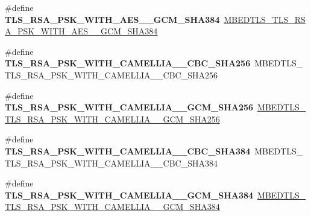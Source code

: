 \begin{DoxyCompactItemize}
\item 
\mbox{\label{compat-1_83_8h_a181e844e18eeacf8f90488d5f73ebfb4}} 
\#define {\bfseries T\+L\+S\+\_\+\+R\+S\+A\+\_\+\+P\+S\+K\+\_\+\+W\+I\+T\+H\+\_\+\+A\+E\+S\+\_\+\_\+\+G\+C\+M\+\_\+\+S\+H\+A384}~\mbox{\hyperlink{ssl__ciphersuites_8h_ad98034d6f7ac6779cc51cb6b7435e2d3}{M\+B\+E\+D\+T\+L\+S\+\_\+\+T\+L\+S\+\_\+\+R\+S\+A\+\_\+\+P\+S\+K\+\_\+\+W\+I\+T\+H\+\_\+\+A\+E\+S\+\_\+\_\+\+G\+C\+M\+\_\+\+S\+H\+A384}}
\item 
\mbox{\label{compat-1_83_8h_a859b00f29ee536f803970513f2ed6ad0}} 
\#define {\bfseries T\+L\+S\+\_\+\+R\+S\+A\+\_\+\+P\+S\+K\+\_\+\+W\+I\+T\+H\+\_\+\+C\+A\+M\+E\+L\+L\+I\+A\+\_\+\_\+\+C\+B\+C\+\_\+\+S\+H\+A256}~M\+B\+E\+D\+T\+L\+S\+\_\+\+T\+L\+S\+\_\+\+R\+S\+A\+\_\+\+P\+S\+K\+\_\+\+W\+I\+T\+H\+\_\+\+C\+A\+M\+E\+L\+L\+I\+A\+\_\+\_\+\+C\+B\+C\+\_\+\+S\+H\+A256
\item 
\mbox{\label{compat-1_83_8h_a581d8a6cbdd0a2f8ef8711332ef2cb10}} 
\#define {\bfseries T\+L\+S\+\_\+\+R\+S\+A\+\_\+\+P\+S\+K\+\_\+\+W\+I\+T\+H\+\_\+\+C\+A\+M\+E\+L\+L\+I\+A\+\_\+\_\+\+G\+C\+M\+\_\+\+S\+H\+A256}~\mbox{\hyperlink{ssl__ciphersuites_8h_a104408aa7e8fc126ea6c98fdd295be0c}{M\+B\+E\+D\+T\+L\+S\+\_\+\+T\+L\+S\+\_\+\+R\+S\+A\+\_\+\+P\+S\+K\+\_\+\+W\+I\+T\+H\+\_\+\+C\+A\+M\+E\+L\+L\+I\+A\+\_\+\_\+\+G\+C\+M\+\_\+\+S\+H\+A256}}
\item 
\mbox{\label{compat-1_83_8h_ab14a2a48c1b1b5e82fa8d16d94ac1ac5}} 
\#define {\bfseries T\+L\+S\+\_\+\+R\+S\+A\+\_\+\+P\+S\+K\+\_\+\+W\+I\+T\+H\+\_\+\+C\+A\+M\+E\+L\+L\+I\+A\+\_\+\_\+\+C\+B\+C\+\_\+\+S\+H\+A384}~M\+B\+E\+D\+T\+L\+S\+\_\+\+T\+L\+S\+\_\+\+R\+S\+A\+\_\+\+P\+S\+K\+\_\+\+W\+I\+T\+H\+\_\+\+C\+A\+M\+E\+L\+L\+I\+A\+\_\+\_\+\+C\+B\+C\+\_\+\+S\+H\+A384
\item 
\mbox{\label{compat-1_83_8h_a71b445ba0f6cbcf80dae4dddac77f5d6}} 
\#define {\bfseries T\+L\+S\+\_\+\+R\+S\+A\+\_\+\+P\+S\+K\+\_\+\+W\+I\+T\+H\+\_\+\+C\+A\+M\+E\+L\+L\+I\+A\+\_\+\_\+\+G\+C\+M\+\_\+\+S\+H\+A384}~\mbox{\hyperlink{ssl__ciphersuites_8h_ac1b345f9b8bd2c833d948a63f6c61ed1}{M\+B\+E\+D\+T\+L\+S\+\_\+\+T\+L\+S\+\_\+\+R\+S\+A\+\_\+\+P\+S\+K\+\_\+\+W\+I\+T\+H\+\_\+\+C\+A\+M\+E\+L\+L\+I\+A\+\_\+\_\+\+G\+C\+M\+\_\+\+S\+H\+A384}}
\item 

\end{DoxyCompactItemize}
